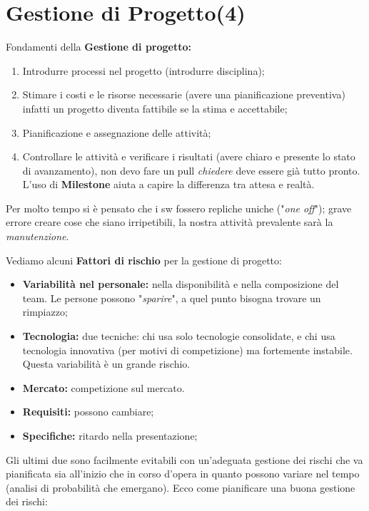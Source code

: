 


\section{Gestione di Progetto(4)}

Fondamenti della \textbf{Gestione di progetto:}
\begin{enumerate}
	\item Introdurre processi nel progetto (introdurre disciplina);
	\item Stimare i costi e le risorse necessarie (avere una pianificazione preventiva) infatti un progetto diventa fattibile se la stima e accettabile;
	\item Pianificazione e assegnazione delle attività;
	\item Controllare le attività e verificare i risultati (avere chiaro e presente lo stato di avanzamento), non devo fare un pull \textit{chiedere} deve essere già tutto pronto. L'uso di \textbf{Milestone} aiuta a capire la differenza tra attesa e realtà.
\end{enumerate}

Per molto tempo si è pensato che i sw fossero repliche uniche ("\textit{one off}"); grave errore creare cose che siano irripetibili, la nostra attività prevalente sarà la \textit{manutenzione}.

Vediamo alcuni \textbf{Fattori di rischio} per la gestione di progetto:

\begin{itemize}

	\item \textbf{Variabilità nel personale:} nella disponibilità e nella composizione del team. Le persone possono "\textit{sparire}", a quel punto bisogna trovare un rimpiazzo;
	
	\item \textbf{Tecnologia:} due tecniche: chi usa solo tecnologie consolidate, e chi usa tecnologia innovativa (per motivi di competizione) ma fortemente instabile. Questa variabilità è un grande rischio.
	
	\item \textbf{Mercato:} competizione sul mercato.
	\item \textbf{Requisiti:} possono cambiare;
	\item \textbf{Specifiche:} ritardo nella presentazione;

\end{itemize}
Gli ultimi due sono facilmente evitabili con un'adeguata gestione dei rischi che va pianificata sia all'inizio che in corso d'opera in quanto possono variare nel tempo (analisi di probabilità che emergano). Ecco come pianificare una buona gestione dei rischi:

